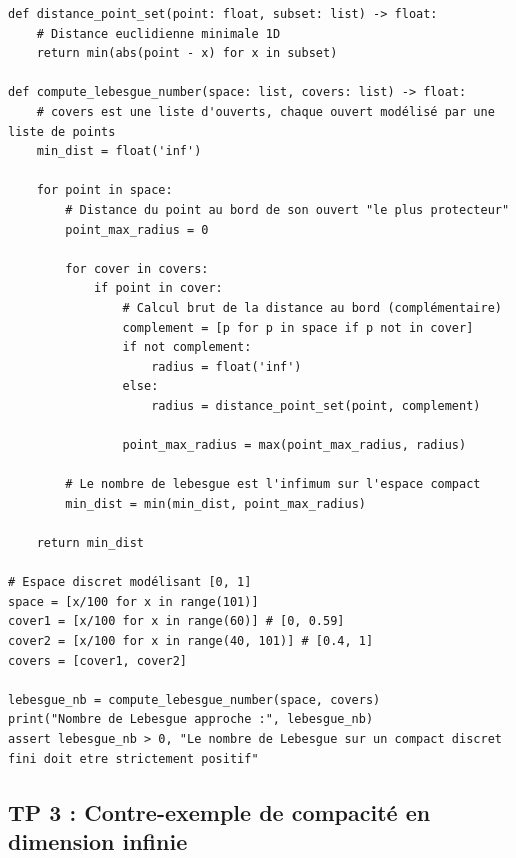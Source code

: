 \documentclass[11pt,a4paper]{article}
\begin{document}
\begin{lstlisting}
def distance_point_set(point: float, subset: list) -> float:
    # Distance euclidienne minimale 1D
    return min(abs(point - x) for x in subset)

def compute_lebesgue_number(space: list, covers: list) -> float:
    # covers est une liste d'ouverts, chaque ouvert modélisé par une liste de points
    min_dist = float('inf')

    for point in space:
        # Distance du point au bord de son ouvert "le plus protecteur"
        point_max_radius = 0

        for cover in covers:
            if point in cover:
                # Calcul brut de la distance au bord (complémentaire)
                complement = [p for p in space if p not in cover]
                if not complement:
                    radius = float('inf')
                else:
                    radius = distance_point_set(point, complement)

                point_max_radius = max(point_max_radius, radius)

        # Le nombre de lebesgue est l'infimum sur l'espace compact
        min_dist = min(min_dist, point_max_radius)

    return min_dist

# Espace discret modélisant [0, 1]
space = [x/100 for x in range(101)]
cover1 = [x/100 for x in range(60)] # [0, 0.59]
cover2 = [x/100 for x in range(40, 101)] # [0.4, 1]
covers = [cover1, cover2]

lebesgue_nb = compute_lebesgue_number(space, covers)
print("Nombre de Lebesgue approche :", lebesgue_nb)
assert lebesgue_nb > 0, "Le nombre de Lebesgue sur un compact discret fini doit etre strictement positif"
\end{lstlisting}

\subsection*{TP 3 : Contre-exemple de compacité en dimension infinie}
\end{document}
